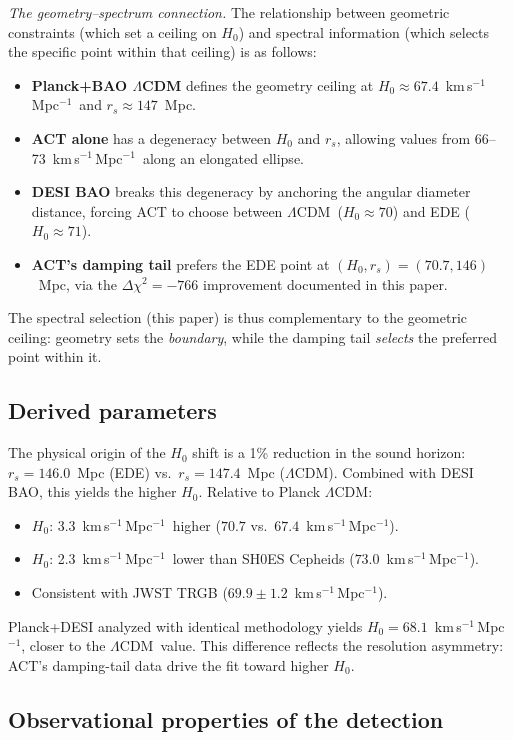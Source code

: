 \documentclass[twocolumn,showpacs,preprintnumbers,amsmath,amssymb,prd]{revtex4-2}
\newcommand{\lcdm}{$\Lambda$CDM}
\newcommand{\kms}{km\,s$^{-1}$\,Mpc$^{-1}$}
\begin{document}
\emph{The geometry--spectrum connection.}
The relationship between geometric constraints (which set a ceiling 
on $H_0$) and spectral information (which selects the specific point within 
that ceiling) is as follows:
\begin{itemize}
\item \textbf{Planck+BAO \lcdm} defines the geometry ceiling at 
$H_0 \approx 67.4$~\kms\ and $r_s \approx 147$~Mpc.
\item \textbf{ACT alone} has a degeneracy between $H_0$ and $r_s$, allowing 
values from 66--73~\kms\ along an elongated ellipse.
\item \textbf{DESI BAO} breaks this degeneracy by anchoring the angular 
diameter distance, forcing ACT to choose between \lcdm\ ($H_0 \approx 70$) 
and EDE ($H_0 \approx 71$).
\item \textbf{ACT's damping tail} prefers the EDE point at $(H_0, r_s) = 
(70.7, 146)$~Mpc, via the $\Delta\chi^2 = -766$ 
improvement documented in this paper.
\end{itemize}
The spectral selection (this paper) is thus complementary to the geometric 
ceiling: geometry sets the \emph{boundary}, while the damping tail 
\emph{selects} the preferred point within it.

\subsection{Derived parameters}

The physical origin of the $H_0$ shift is a 1\% reduction in the sound 
horizon: $r_s = 146.0$~Mpc (EDE) vs.\ $r_s = 147.4$~Mpc (\lcdm). Combined 
with DESI BAO, this yields the higher $H_0$. Relative to Planck \lcdm:
\begin{itemize}
\item $H_0$: 3.3~\kms\ higher ($70.7$ vs.\ $67.4$~\kms).
\item $H_0$: 2.3~\kms\ lower than SH0ES Cepheids ($73.0$~\kms).
\item Consistent with JWST TRGB ($69.9 \pm 1.2$~\kms).
\end{itemize}

Planck+DESI analyzed with identical methodology yields $H_0 = 68.1$~\kms, 
closer to the \lcdm\ value. This difference reflects the resolution asymmetry: 
ACT's damping-tail data drive the fit toward higher $H_0$.

\subsection{Observational properties of the detection}
\end{document}
